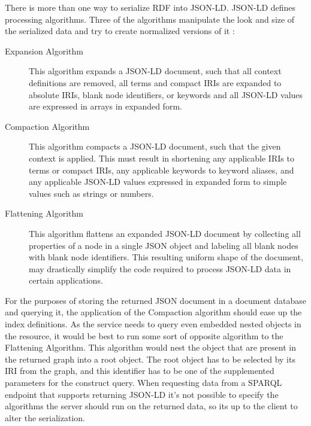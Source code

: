There is more than one way to serialize RDF into JSON-LD. JSON-LD defines processing algorithms. Three of the algorithms manipulate the look and size of the serialized data and try to create normalized versions of it \cite{onlineW3CJsonLdAlgorithmsSpec}:
\begin{description}
	\item[Expansion Algorithm] This algorithm expands a JSON-LD document, such that all context definitions are removed, all terms and compact IRIs are expanded to absolute IRIs, blank node identifiers, or keywords and all JSON-LD values are expressed in arrays in expanded form.
	\item[Compaction Algorithm] This algorithm compacts a JSON-LD document, such that the given context is applied. This must result in shortening any applicable IRIs to terms or compact IRIs, any applicable keywords to keyword aliases, and any applicable JSON-LD values expressed in expanded form to simple values such as strings or numbers.
	\item[Flattening Algorithm] This algorithm flattens an expanded JSON-LD document by collecting all properties of a node in a single JSON object and labeling all blank nodes with blank node identifiers. This resulting uniform shape of the document, may drastically simplify the code required to process JSON-LD data in certain applications.
\end{description}
For the purposes of storing the returned JSON document in a document database and querying it, the application of the Compaction algorithm should ease up the index definitions. 
As the service needs to query even embedded nested objects in the resource, it would be best to run some sort of opposite algorithm to the Flattening Algorithm. This algorithm would nest the object that are present in the returned 
graph into a root object. The root object has to be selected by its IRI from the graph, and this identifier has to be one of the supplemented parameters for the construct query. %
When requesting data from a SPARQL endpoint that supports returning JSON-LD it's not possible to specify the algorithms the server should run on the returned data, so its up to the client to alter the serialization.




